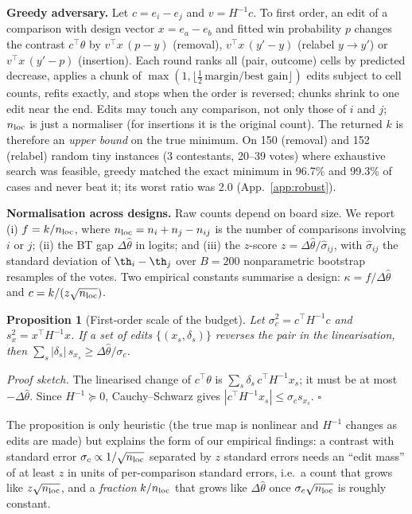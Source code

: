\documentclass{article}
\newtheorem{proposition}{Proposition}
\newcommand{\nloc}{n_{\rm loc}}
\newcommand{\thh}{\hat\theta}
\begin{document}
\textbf{Greedy adversary.} Let $c=e_i-e_j$ and $v=H^{-1}c$. To first order, an edit of a comparison with design vector $x=e_a-e_b$ and fitted win probability $p$ changes the contrast $c^\top\theta$ by $v^\top x\,(p-y)$ (removal), $v^\top x\,(y'-y)$ (relabel $y\to y'$) or $v^\top x\,(y'-p)$ (insertion). Each round ranks all (pair, outcome) cells by predicted decrease, applies a chunk of $\max(1,\lfloor\tfrac12\,\text{margin}/\text{best gain}\rfloor)$ edits subject to cell counts, refits exactly, and stops when the order is reversed; chunks shrink to one edit near the end. Edits may touch any comparison, not only those of $i$ and $j$; $\nloc$ is just a normaliser (for insertions it is the original count). The returned $k$ is therefore an \emph{upper bound} on the true minimum. On 150 (removal) and 152 (relabel) random tiny instances (3 contestants, 20--39 votes) where exhaustive search was feasible, greedy matched the exact minimum in 96.7\% and 99.3\% of cases and never beat it; its worst ratio was 2.0 (App.~\ref{app:robust}).

\textbf{Normalisation across designs.} Raw counts depend on board size. We report (i) $f=k/\nloc$, where $\nloc=n_i+n_j-n_{ij}$ is the number of comparisons involving $i$ or $j$; (ii) the BT gap $\Delta\thh$ in logits; and (iii) the $z$-score $z=\Delta\thh/\hat\sigma_{ij}$, with $\hat\sigma_{ij}$ the standard deviation of $\th_i-\th_j$ over $B{=}200$ nonparametric bootstrap resamples of the votes. Two empirical constants summarise a design: $\kappa=f/\Delta\thh$ and $c=k/(z\sqrt{\nloc})$.

\begin{proposition}[First-order scale of the budget]\label{prop:scale}
Let $\sigma_c^2=c^\top H^{-1}c$ and $s_x^2=x^\top H^{-1}x$. If a set of edits $\{(x_s,\delta_s)\}$ reverses the pair in the linearisation, then $\sum_s|\delta_s|\,s_{x_s}\geq\Delta\thh/\sigma_c$.
\end{proposition}
\emph{Proof sketch.} The linearised change of $c^\top\theta$ is $\sum_s\delta_s\,c^\top H^{-1}x_s$; it must be at most $-\Delta\thh$. Since $H^{-1}\succeq0$, Cauchy--Schwarz gives $|c^\top H^{-1}x_s|\leq\sigma_c s_{x_s}$. \hfill$\square$

\noindent The proposition is only heuristic (the true map is nonlinear and $H^{-1}$ changes as edits are made) but explains the form of our empirical findings: a contrast with standard error $\sigma_c\propto1/\sqrt{\nloc}$ separated by $z$ standard errors needs an ``edit mass'' of at least $z$ in units of per-comparison standard errors, i.e.\ a count that grows like $z\sqrt{\nloc}$, and a \emph{fraction} $k/\nloc$ that grows like $\Delta\thh$ once $\sigma_c\sqrt{\nloc}$ is roughly constant.
\end{document}
